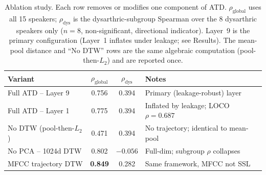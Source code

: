 \begin{table}[t]
\centering
\caption{Ablation study. Each row removes or modifies one component of ATD.
$\rho_\text{global}$ uses all 15 speakers; $\rho_\text{dys}$ is the
dysarthric-subgroup Spearman over the 8 dysarthric speakers only ($n=8$,
non-significant, directional indicator). Layer~9 is the primary
configuration (Layer~1 inflates under leakage; see Results). The mean-pool
distance and ``No DTW'' rows are the same algebraic computation
(pool-then-$L_2$) and are reported once.}
\label{tab:ablations}
\begin{tabular}{lccl}
\toprule
Variant & $\rho_\text{global}$ & $\rho_\text{dys}$ & Notes \\
\midrule
Full ATD -- Layer 9 & 0.756 & 0.394 & Primary (leakage-robust) layer \\
Full ATD -- Layer 1 & 0.775 & 0.394 & Inflated by leakage; LOCO $\rho=0.687$ \\
No DTW (pool-then-$L_2$) & 0.471 & 0.394 & No trajectory; identical to mean-pool \\
No PCA -- 1024d DTW & 0.802 & $-0.056$ & Full-dim; subgroup $\rho$ collapses \\
MFCC trajectory DTW & \textbf{0.849} & 0.282 & Same framework, MFCC not SSL \\
\bottomrule
\end{tabular}
\end{table}
